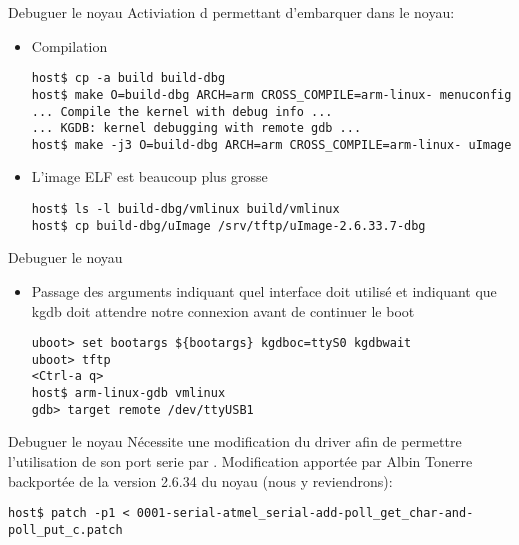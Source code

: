 \begin{frame}[fragile=singleslide]{Debuguer le noyau}
  Activiation d  permettant d'embarquer  dans
  le noyau:
  \begin{itemize}
  \item Compilation
    \begin{lstlisting}
host$ cp -a build build-dbg
host$ make O=build-dbg ARCH=arm CROSS_COMPILE=arm-linux- menuconfig
... Compile the kernel with debug info ...
... KGDB: kernel debugging with remote gdb ...
host$ make -j3 O=build-dbg ARCH=arm CROSS_COMPILE=arm-linux- uImage
    \end{lstlisting} 
  \item L'image ELF est beaucoup plus grosse
    \begin{lstlisting}
host$ ls -l build-dbg/vmlinux build/vmlinux
host$ cp build-dbg/uImage /srv/tftp/uImage-2.6.33.7-dbg
    \end{lstlisting} 
  \end{itemize}
\end{frame}
\begin{frame}[fragile=singleslide]{Debuguer le noyau}
  \begin{itemize}
  \item  Passage des arguments   indiquant  quel interface
     doit utilisé et   indiquant que kgdb doit
    attendre notre connexion avant de continuer le boot
    \begin{lstlisting}
uboot> set bootargs ${bootargs} kgdboc=ttyS0 kgdbwait
uboot> tftp
<Ctrl-a q>
host$ arm-linux-gdb vmlinux 
gdb> target remote /dev/ttyUSB1
    \end{lstlisting} 
  \end{itemize}
\end{frame}

\begin{frame}[fragile=singleslide]{Debuguer le noyau}
  Nécessite  une modification  du driver    afin de
  permettre   l'utilisation  de   son  port   serie   par  .
  Modification  apportée par  Albin Tonerre  backportée de  la version
  2.6.34 du noyau (nous y reviendrons):
  \begin{lstlisting}
host$ patch -p1 < 0001-serial-atmel_serial-add-poll_get_char-and-poll_put_c.patch 
  \end{lstlisting} 

\end{frame}

